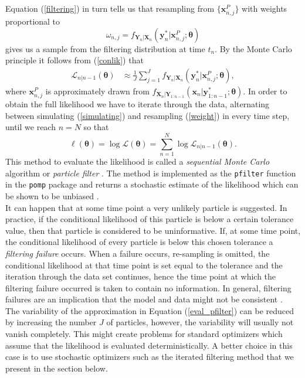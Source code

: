 Equation (\ref{filtering}) in turn  tells us that resampling from $\{\bm{x}^P_{n,j}\}$ with weights proportional to 
\begin{equation}
\omega_{n,j}=f_{\bm{Y}_n|\bm{X}_{n}}(\bm{y}^*_{n}|\bm{x}^P_{n,j};\bm{\theta})
\label{weight}
\end{equation}
 gives us a sample from the filtering distribution at time $t_n$.  By the Monte Carlo principle it follows from (\ref{conlik}) that 
\begin{align*}
\mathcal{L}_{n|n-1}(\bm{\theta})& \approx \frac{1}{J}\sum_{j=1}^J f_{\bm{Y}_n|\bm{X}_{n}}(\bm{y}^*_{n}|\bm{x}^P_{n,j};\bm{\theta}),
\end{align*}
where $\bm{x}^P_{n,j}$ is approximately drawn from $f_{\bm{X}_n|\bm{Y}_{1:n-1}}(\bm{x}_{n}|\bm{y}^*_{1:n-1};\bm{\theta})$.
In order to obtain the full likelihood we have to iterate  through the data, alternating  between simulating (\ref{simulating})  and resampling (\ref{weight}) in every time step, until we reach  $n=N$ so that
\begin{equation}
\ell(\bm{\theta})= \log \mathcal{L}(\bm{\theta})= \sum_{n=1}^N \log \mathcal{L}_{n|n-1}(\bm{\theta}).
\label{eval_pfilter}
\end{equation}
This method to evaluate the likelihood is called a \textit{sequential Monte Carlo} algorithm or \textit{particle filter}   \citep{ Kitagawa1987,pfilter, Arulampalam2002}. The method  is implemented as the \texttt{pfilter} function   in the \texttt{pomp} package \citep{kingNgu} and  returns a stochastic estimate of the likelihood which can be shown to be unbiased \citep{DelMoral1996}. \\
It can happen that at some time point a very unlikely particle is suggested. In practice, if the conditional likelihood of this particle  is below  a certain tolerance value, then that particle is considered to be uninformative.
If,  at some time point, the conditional likelihood of every particle is below this chosen tolerance a \textit{filtering failure} occurs. When a failure occurs,  re-sampling is omitted, the conditional likelihood at that time point is set  equal to the tolerance and the iteration through the data set continues, hence the  time point at which the filtering failure occurred is taken to contain no information. In general, filtering failures are an implication that the model and data might not be consistent \citep{King2017}.\\
The variability of the approximation in Equation (\ref{eval_pfilter}) can be reduced by increasing the number $J$ of particles, however, the variability will usually not vanish completely. 
This might create  problems for standard optimizers which assume that the likelihood is evaluated deterministically. A better choice in this case is to use  stochastic optimizers  such as the iterated filtering method that we present in the section below.
